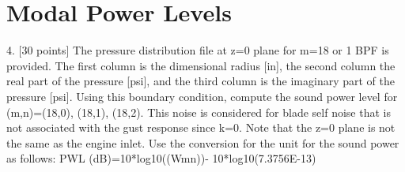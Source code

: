 \documentclass[]{aiaa-tc}%
\begin{document}
\section{Modal Power Levels}

4. [30 points] The pressure distribution file at z=0 plane for m=18 or 1 BPF is provided. The first column is the dimensional radius [in], the second column the real part of the pressure [psi], and the third column is the imaginary part of the pressure [psi]. Using this boundary condition, compute the sound power level for (m,n)=(18,0), (18,1), (18,2). This noise is considered for blade self noise that is not associated with the gust response since k=0. Note that the z=0 plane is not the same as the engine inlet. Use the conversion for the unit for the sound power as follows: PWL (dB)=10*log10((Wmn))- 10*log10(7.3756E-13)
\end{document}
